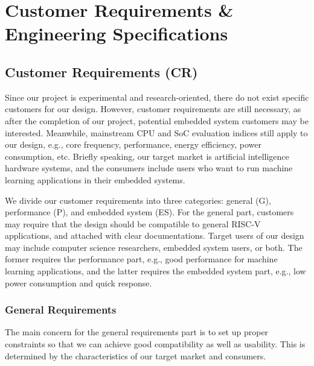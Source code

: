 
\let\clearpage\relax
\chapter{Customer Requirements \& Engineering Specifications}

\section{Customer Requirements (CR)}
Since our project is experimental and research-oriented, there do not exist specific customers for our design. However, customer requirements are still necessary, as after the completion of our project, potential embedded system customers may be interested. Meanwhile, mainstream CPU and SoC evaluation indices still apply to our design, e.g., core frequency, performance, energy efficiency, power consumption, etc. Briefly speaking, our target market is artificial intelligence hardware systems, and the consumers include users who want to run machine learning applications in their embedded systems.

We divide our customer requirements into three categories: general (G), performance (P), and embedded system (ES). For the general part, customers may require that the design should be compatible to general RISC-V applications, and attached with clear documentations. Target users of our design may include computer science researchers, embedded system users, or both. The former requires the performance part, e.g., good performance for machine learning applications, and the latter requires the embedded system part, e.g., low power consumption and quick response.


\subsection{General Requirements}
The main concern for the general requirements part is to set up proper constraints so that we can achieve good compatibility as well as usability. This is determined by the characteristics of our target market and consumers.

